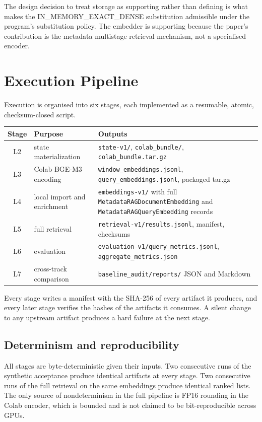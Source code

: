 \documentclass[11pt,a4paper]{article}
\begin{document}
The design decision to treat storage as supporting rather than
defining is what makes the IN\_MEMORY\_EXACT\_DENSE substitution
admissible under the program's substitution policy. The embedder is
supporting because the paper's contribution is the metadata
multistage retrieval mechanism, not a specialised encoder.

\section{Execution Pipeline}\label{sec:pipeline}

Execution is organised into six stages, each implemented as a
resumable, atomic, checksum-closed script.

\begin{center}
\small
\begin{tabular}{c p{4.4cm} p{7.0cm}}
\toprule
\textbf{Stage} & \textbf{Purpose} & \textbf{Outputs} \\
\midrule
L2 & state materialization & \texttt{state-v1/}, \texttt{colab\_bundle/},
     \texttt{colab\_bundle.tar.gz} \\
L3 & Colab BGE-M3 encoding & \texttt{window\_embeddings.jsonl},
     \texttt{query\_embeddings.jsonl}, packaged tar.gz \\
L4 & local import and enrichment & \texttt{embeddings-v1/} with full
     \texttt{MetadataRAGDocumentEmbedding} and
     \texttt{MetadataRAGQueryEmbedding} records \\
L5 & full retrieval & \texttt{retrieval-v1/results.jsonl}, manifest,
     checksums \\
L6 & evaluation & \texttt{evaluation-v1/query\_metrics.jsonl},
     \texttt{aggregate\_metrics.json} \\
L7 & cross-track comparison & \texttt{baseline\_audit/reports/} JSON
     and Markdown \\
\bottomrule
\end{tabular}
\end{center}

Every stage writes a manifest with the SHA-256 of every artifact it
produces, and every later stage verifies the hashes of the artifacts
it consumes. A silent change to any upstream artifact produces a
hard failure at the next stage.

\subsection{Determinism and reproducibility}
All stages are byte-deterministic given their inputs. Two
consecutive runs of the synthetic acceptance produce identical
artifacts at every stage. Two consecutive runs of the full retrieval
on the same embeddings produce identical ranked lists. The only
source of nondeterminism in the full pipeline is FP16 rounding in
the Colab encoder, which is bounded and is not claimed to be
bit-reproducible across GPUs.
\end{document}
